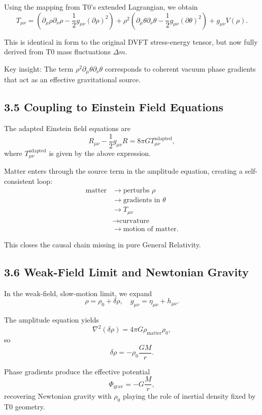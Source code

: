 	Using the mapping from T0's extended Lagrangian, we obtain
	\[
	T_{\mu\nu} = (\partial_\mu \rho \partial_\nu \rho - \frac{1}{2} g_{\mu\nu} (\partial \rho)^2) + \rho^2 (\partial_\mu \theta \partial_\nu \theta - \frac{1}{2} g_{\mu\nu} (\partial \theta)^2) + g_{\mu\nu} V(\rho).
	\]
	
	
	This is identical in form to the original DVFT stress-energy tensor, but now fully derived from T0 mass fluctuations $\Delta m$.
	
	Key insight: The term $\rho^2 \partial_\mu \theta \partial_\nu \theta$ corresponds to coherent vacuum phase gradients that act as an effective gravitational source.
	
	\subsection{3.5 Coupling to Einstein Field Equations}
	
	The adapted Einstein field equations are
	\[
	R_{\mu\nu} - \frac{1}{2} g_{\mu\nu} R = 8\pi G T_{\mu\nu}^{\text{adapted}},
	\]
	where $T_{\mu\nu}^{\text{adapted}}$ is given by the above expression.
	
	Matter enters through the source term in the amplitude equation, creating a self-consistent loop:
\[
\begin{aligned}
	\text{matter} &\to \text{perturbs } \rho \\
	&\to \text{gradients in } \theta \\
	&\to T_{\mu\nu} \\
	&\to \text{curvature} \\
	&\to \text{motion of matter}.
\end{aligned}
\]
	
	This closes the causal chain missing in pure General Relativity.
	
	\subsection{3.6 Weak-Field Limit and Newtonian Gravity}
	
	In the weak-field, slow-motion limit, we expand
	\[
	\rho = \rho_0 + \delta \rho, \quad g_{\mu\nu} = \eta_{\mu\nu} + h_{\mu\nu}.
	\]
	
	The amplitude equation yields
	\[
	\nabla^2 (\delta \rho) = 4\pi G \rho_{\text{matter}} \rho_0,
	\]
	so
	\[
	\delta \rho = -\rho_0 \frac{GM}{r}.
	\]
	
	Phase gradients produce the effective potential
	\[
	\Phi_{\text{grav}} = -G \frac{M}{r},
	\]
	recovering Newtonian gravity with $\rho_0$ playing the role of inertial density fixed by T0 geometry.
	
